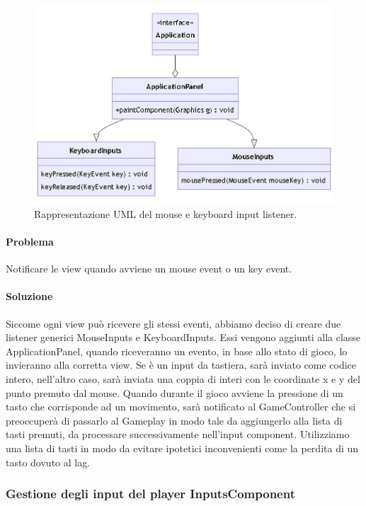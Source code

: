 \documentclass[a4paper,12pt]{report}
\begin{document}
\begin{figure}[H]
\centering{}
\includegraphics[width=\textwidth]{img/input.jpg}
\caption{Rappresentazione UML del mouse e keyboard input listener.}
\end{figure}

\paragraph{Problema} Notificare le view quando avviene un mouse event o un key event.

\paragraph{Soluzione} Siccome ogni view può ricevere gli stessi eventi, abbiamo deciso di creare due listener generici MouseInputs e KeyboardInputs. Essi vengono aggiunti alla classe ApplicationPanel, quando riceveranno un evento, in base allo stato di gioco, lo invieranno alla corretta view. Se è un input da tastiera, sarà inviato come codice intero, nell’altro caso, sarà inviata una coppia di interi con le coordinate x e y del punto premuto dal mouse. Quando durante il gioco avviene la pressione di un tasto che corrisponde ad un movimento, sarà notificato al GameController che si preoccuperà di passarlo al Gameplay in modo tale da aggiungerlo alla lista di tasti premuti, da processare successivamente nell’input component. Utilizziamo una lista di tasti in modo da evitare ipotetici inconvenienti come la perdita di un tasto dovuto al lag.

\subsubsection{Gestione degli input del player InputsComponent}
\end{document}
